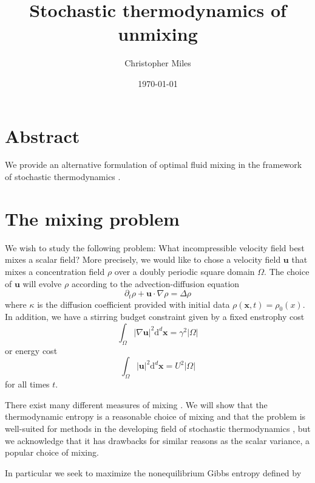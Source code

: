 \documentclass[12pt]{article}
\begin{document}
\title{ Stochastic thermodynamics of unmixing }
\author{Christopher Miles}
\date{\today}

\maketitle

\section{Abstract}

We provide an alternative formulation of optimal fluid mixing in the framework of stochastic thermodynamics \cite{Seifert2012a}.

\section{The mixing problem}
\label{sec:mixing}
We wish to study the following problem:  What incompressible velocity field best mixes a scalar field? 
More precisely, we would like to chose a velocity field $\mathbf{u}$ that mixes a concentration field $\rho$ over a doubly periodic square domain $\Omega$. The choice of $\mathbf{u}$ will evolve $\rho$ according to the advection-diffusion equation 
\begin{equation}
\label{eq:ade}
\partial_{t}\rho+\mathbf{u}\cdot\nabla \rho = \Delta \rho
\end{equation}
where $\kappa$ is the diffusion coefficient provided with initial data $\rho(\mathbf{x},t)=\rho_{0}(x)$. In addition, we have a stirring budget constraint given by a fixed enstrophy cost 
\begin{equation}
\int_{\Omega}|\nabla \mathbf{u}|^{2} \text{d}^{d}\mathbf{x} = \gamma^2 |\Omega|
\end{equation}
or energy cost
\begin{equation}
\int_{\Omega}| \mathbf{u}|^{2} \text{d}^{d}\mathbf{x} = U^2|\Omega| 
\end{equation}
for all times $t$.


There exist many different measures of mixing \cite{JLT2012}. We will show that the thermodynamic entropy is a reasonable choice of mixing and that the problem is well-suited for methods in the developing field of stochastic thermodynamics \cite{Seifert2012a}, but we acknowledge that it has drawbacks for similar reasons as the scalar variance, a popular choice of mixing. 

In particular we seek to maximize the nonequilibrium Gibbs entropy defined by 
\end{document}
